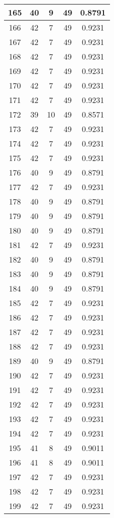 \documentclass[letterpaper, 12pt]{article}
\begin{document}
\begin{longtable}{|c|c|c|c|c|}
\hline
165 & 40 & 9 & 49 & 0.8791 \\
\hline
166 & 42 & 7 & 49 & 0.9231 \\
\hline
167 & 42 & 7 & 49 & 0.9231 \\
\hline
168 & 42 & 7 & 49 & 0.9231 \\
\hline
169 & 42 & 7 & 49 & 0.9231 \\
\hline
170 & 42 & 7 & 49 & 0.9231 \\
\hline
171 & 42 & 7 & 49 & 0.9231 \\
\hline
172 & 39 & 10 & 49 & 0.8571 \\
\hline
173 & 42 & 7 & 49 & 0.9231 \\
\hline
174 & 42 & 7 & 49 & 0.9231 \\
\hline
175 & 42 & 7 & 49 & 0.9231 \\
\hline
176 & 40 & 9 & 49 & 0.8791 \\
\hline
177 & 42 & 7 & 49 & 0.9231 \\
\hline
178 & 40 & 9 & 49 & 0.8791 \\
\hline
179 & 40 & 9 & 49 & 0.8791 \\
\hline
180 & 40 & 9 & 49 & 0.8791 \\
\hline
181 & 42 & 7 & 49 & 0.9231 \\
\hline
182 & 40 & 9 & 49 & 0.8791 \\
\hline
183 & 40 & 9 & 49 & 0.8791 \\
\hline
184 & 40 & 9 & 49 & 0.8791 \\
\hline
185 & 42 & 7 & 49 & 0.9231 \\
\hline
186 & 42 & 7 & 49 & 0.9231 \\
\hline
187 & 42 & 7 & 49 & 0.9231 \\
\hline
188 & 42 & 7 & 49 & 0.9231 \\
\hline
189 & 40 & 9 & 49 & 0.8791 \\
\hline
190 & 42 & 7 & 49 & 0.9231 \\
\hline
191 & 42 & 7 & 49 & 0.9231 \\
\hline
192 & 42 & 7 & 49 & 0.9231 \\
\hline
193 & 42 & 7 & 49 & 0.9231 \\
\hline
194 & 42 & 7 & 49 & 0.9231 \\
\hline
195 & 41 & 8 & 49 & 0.9011 \\
\hline
196 & 41 & 8 & 49 & 0.9011 \\
\hline
197 & 42 & 7 & 49 & 0.9231 \\
\hline
198 & 42 & 7 & 49 & 0.9231 \\
\hline
199 & 42 & 7 & 49 & 0.9231 \\
\hline
\end{longtable}
\end{document}
